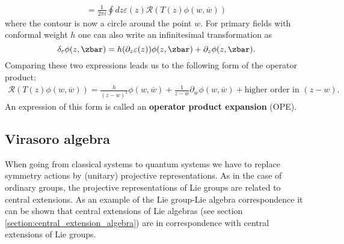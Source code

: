     \begin{gather}
        [Q_\varepsilon, \phi(w, \overline{w})] = \frac{1}{2\pi i}\oint dz\varepsilon(z)\mathcal{R}(T(z)\phi(w, \overline{w}))
    \end{gather}
    where the contour is now a circle around the point $w$. For primary fields with conformal weight $h$ one can also write an infinitesimal transformation as \[\delta_\varepsilon\phi(z, \zbar) = h(\partial_z\varepsilon(z))\phi(z, \zbar) + \partial_z\phi(z, \zbar).\] Comparing these two expressions leads us to the following form of the operator product:
    \begin{gather}
        \mathcal{R}(T(z)\phi(w, \overline{w})) = \frac{h}{(z-w)^2}\phi(w, \overline{w}) + \frac{1}{z-w}\partial_w\phi(w, \overline{w}) + \text{higher order in } (z-w).
    \end{gather}
    An expression of this form is called an \textbf{operator product expansion} (OPE).

\subsection{Virasoro algebra}

    When going from classical systems to quantum systems we have to replace symmetry actions by (unitary) projective representations. As in the case of ordinary groups, the projective representations of Lie groups are related to central extensions. As an example of the Lie group-Lie algebra correspondence it can be shown that central extensions of Lie algebras (see section \ref{section:central_extension_algebra}) are in correspondence with central extensions of Lie groups.


